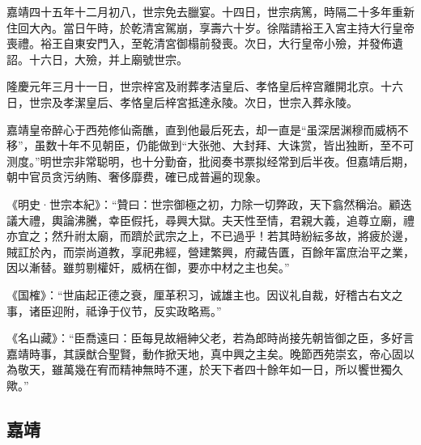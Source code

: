 嘉靖四十五年十二月初八，世宗免去臘宴。十四日，世宗病篤，時隔二十多年重新住回大內。當日午時，於乾清宮駕崩，享壽六十岁。徐階請裕王入宮主持大行皇帝喪禮。裕王自東安門入，至乾清宮御榻前發喪。次日，大行皇帝小殮，并發佈遺詔。十六日，大殮，并上廟號世宗。

隆慶元年三月十一日，世宗梓宮及祔葬孝洁皇后、孝恪皇后梓宫離開北京。十六日，世宗及孝潔皇后、孝恪皇后梓宮抵達永陵。次日，世宗入葬永陵。

嘉靖皇帝醉心于西苑修仙斋醮，直到他最后死去，却一直是“虽深居渊穆而威柄不移”，虽数十年不见朝臣，仍能做到“大张弛、大封拜、大诛赏，皆出独断，至不可测度。”明世宗非常聪明，也十分勤奋，批阅奏书票拟经常到后半夜。但嘉靖后期，朝中官员贪污纳贿、奢侈靡费，確已成普遍的现象。

《明史·世宗本紀》：“贊曰：世宗御極之初，力除一切弊政，天下翕然稱治。顧迭議大禮，輿論沸騰，幸臣假托，尋興大獄。夫天性至情，君親大義，追尊立廟，禮亦宜之；然升祔太廟，而躋於武宗之上，不已過乎！若其時紛紜多故，將疲於邊，賊訌於內，而崇尚道教，享祀弗經，營建繁興，府藏告匱，百餘年富庶治平之業，因以漸替。雖剪剔權奸，威柄在御，要亦中材之主也矣。”

《国榷》：“世庙起正德之衰，厘革积习，诚雄主也。因议礼自裁，好稽古右文之事，诸臣迎附，祗诤于仪节，反实政略焉。”

《名山藏》：“臣喬遠曰：臣每見故縉紳父老，若為郎時尚接先朝皆御之臣，多好言嘉靖時事，其謨猷合聖賢，動作掀天地，真中興之主矣。晚節西苑崇玄，帝心固以為敬天，雖萬幾在宥而精神無時不運，於天下者四十餘年如一日，所以饗世獨久歟。”

\subsection{嘉靖}


